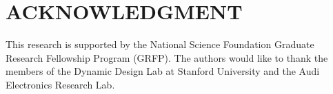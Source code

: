 \documentclass[letterpaper, 10 pt, conference]{ieeeconf}  %
\begin{document}








\section*{ACKNOWLEDGMENT}
This research is supported by the National Science Foundation Graduate Research Fellowship Program (GRFP). 
The authors would like to thank the members of the Dynamic Design Lab at Stanford University and the Audi Electronics Research Lab.







\end{document}
